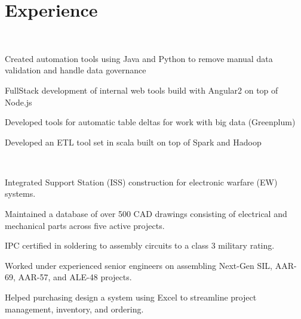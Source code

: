 \documentclass[letterpaper]{deedy-resume-openfont} %
\begin{document}
\begin{minipage}[t]{0.66\textwidth} %


\section{Experience}

\\

\vspace{\topsep} %
\begin{tightitemize}
\item Created automation tools using Java and Python to remove manual data validation and handle data governance
\item FullStack development of internal web tools build with Angular2 on top of Node.js
\item Developed tools for automatic table deltas for work with big data (Greenplum)
\item Developed an ETL tool set in scala built on top of Spark and Hadoop
\end{tightitemize}

\sectionspace %

\\

\vspace{\topsep} %
\begin{tightitemize}
\item Integrated Support Station (ISS) construction for electronic warfare (EW) systems.
\item Maintained a database of over 500 CAD drawings consisting of electrical and mechanical parts across five active projects.
\item IPC certified in soldering to assembly circuits to a class 3 military rating.
\item Worked under experienced senior engineers on assembling Next-Gen SIL, AAR-69, AAR-57, and ALE-48 projects.
\item Helped purchasing design a system using Excel to streamline project management, inventory, and ordering.
\end{tightitemize}


\end{minipage}
\end{document}
